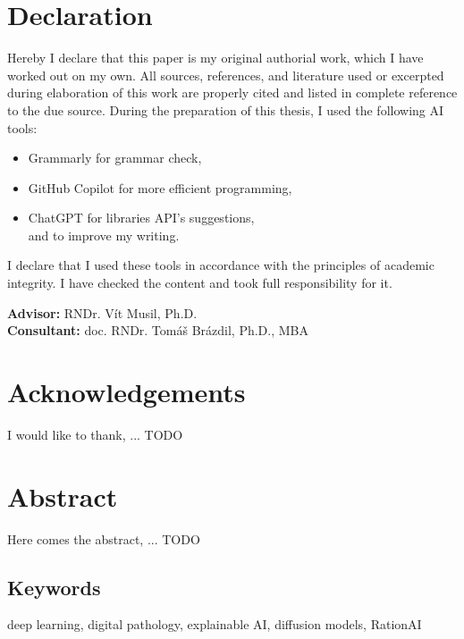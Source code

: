 \section*{Declaration} Hereby I declare that this paper is my original authorial work, which
I have worked out on my own. All sources, references, and literature used or excerpted during elaboration of this work are properly
cited and listed in complete reference to the due source. During the
preparation of this thesis, I used the following AI tools:
\begin{itemize}
    \item Grammarly for grammar check,
    \item GitHub Copilot for more efficient programming,
    \item ChatGPT for libraries API's suggestions,\\
          and to improve my writing.
\end{itemize}
I declare that I used these tools in accordance with the principles of
academic integrity. I have checked the content and took full responsibility
for it.

\vfill\noindent
\textbf{Advisor:} RNDr. Vít Musil, Ph.D.
\\\textbf{Consultant:} doc. RNDr. Tomáš Brázdil, Ph.D., MBA
\cleardoublepage

\section*{Acknowledgements}
I would like to thank, ... TODO
\cleardoublepage

\section*{Abstract}
Here comes the abstract, ... TODO
\vfill\noindent
\subsection*{Keywords}
deep learning, digital pathology, explainable AI, diffusion models, RationAI
\cleardoublepage
